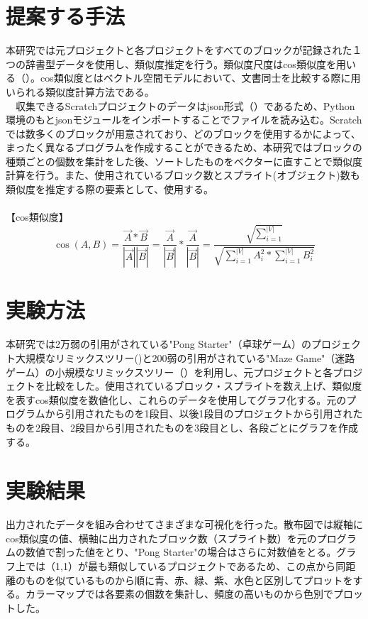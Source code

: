 \documentclass[twocolumn,9pt,a4paper]{jsarticle}
\begin{document}
\section{提案する手法}
本研究では元プロジェクトと各プロジェクトをすべてのブロックが記録された１つの辞書型データを使用し、類似度推定を行う。類似度尺度はcos類似度を用いる（\cite{cos}）。cos類似度とはベクトル空間モデルにおいて、文書同士を比較する際に用いられる類似度計算方法である。
\\
　収集できるScratchプロジェクトのデータはjson形式（\cite{json_py}）であるため、Python環境のもとjsonモジュールをインポートすることでファイルを読み込む。Scratchでは数多くのブロックが用意されており、どのブロックを使用するかによって、まったく異なるプログラムを作成することができるため、本研究ではブロックの種類ごとの個数を集計をした後、ソートしたものをベクターに直すことで類似度計算を行う。また、使用されているブロック数とスプライト(オブジェクト)数も類似度を推定する際の要素として、使用する。
\\
\\【cos類似度】
\begin{equation}
\cos(A,B) = \frac{\vec{A} \ast\vec{B}} {|\vec{A}||\vec{B}|}  = \frac{\vec{A}}{|\vec{B}|}\ast\frac{\vec{A}}{|\vec{B}|} = \frac{\sqrt {\sum_{i=1}^{|V|}}}{\sqrt{\sum_{i=1}^{|V|}A_i^2\ast\sum_{i=1}^{|V|}B_i^2}}
\end{equation}


\section{実験方法}
本研究では2万弱の引用がされている"Pong Starter"（卓球ゲーム）のプロジェクト大規模なリミックスツリー(\cite{pongret})と200弱の引用がされている"Maze Game"（迷路ゲーム）の小規模なリミックスツリー（\cite{mazeret}）を利用し、元プロジェクトと各プロジェクトを比較をした。使用されているブロック・スプライトを数え上げ、類似度を表すcos類似度を数値化し、これらのデータを使用してグラフ化する。元のプログラムから引用されたものを1段目、以後1段目のプロジェクトから引用されたものを2段目、2段目から引用されたものを3段目とし、各段ごとにグラフを作成する。

\section{実験結果}
出力されたデータを組み合わせてさまざまな可視化を行った。散布図では縦軸にcos類似度の値、横軸に出力されたブロック数（スプライト数）を元のプログラムの数値で割った値をとり、"Pong Starter"の場合はさらに対数値をとる。グラフ上では（1,1）が最も類似しているプロジェクトであるため、この点から同距離のものを似ているものから順に青、赤、緑、紫、水色と区別してプロットをする。カラーマップでは各要素の個数を集計し、頻度の高いものから色別でプロットした。
\\
\end{document}
